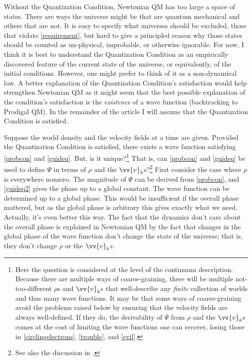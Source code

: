 \documentclass[onecolumn,secnumarabic,balancelastpage,amsmath,amssymb,nofootinbib]{article}
\begin{document}
Without the Quantization Condition, Newtonian QM has too large a space of states.  There are ways the universe might be that are quantum mechanical and others that are not.  It is easy to specify what universes should be excluded, those that violate \eqref{requirement}, but hard to give a principled reason why those states should be counted as un-physical, improbable, or otherwise ignorable.  For now, I think it is best to understand the Quantization Condition as an empirically discovered feature of the current state of the universe, or equivalently, of the initial conditions.  However, one might prefer to think of it as a non-dynamical law.  A better explanation of the Quantization Condition's satisfaction would help strengthen Newtonian QM as it might seem that the best possible explanation of the condition's satisfaction is the \emph{existence} of a wave function (backtracking to Prodigal QM).  In the remainder of the article I will assume that the Quantization Condition is satisfied.

Suppose the world density and the velocity fields at a time are given.  Provided the Quantization Condition is satisfied, there exists a wave function satisfying \eqref{probcon} and \eqref{guideq}.  But, is it unique?\footnote{Here the question is considered at the level of the continuum description.  Because there are multiple ways of coarse-graining, there will be multiple not-too-different $\rho$s and $\vv{v}_k$s that well-describe any \emph{finite} collection of worlds and thus many wave functions.  It may be that some ways of coarse-graining avoid the problems raised below by ensuring that the velocity fields are always well-defined.  If they do, the derivability of $\Psi$ from $\rho$ and the $\vv{v}_k$s comes at the cost of limiting the wave functions one can recover, losing those in \eqref{circlingelectrons}, \eqref{trouble}, and \eqref{evil}.}  That is, can \eqref{probcon} and \eqref{guideq} be used to define $\Psi$ in terms of $\rho$ and the $\vv{v}_k$s?\footnote{See also the discussion in \citet[][]{holland2005}.}  First consider the case where $\rho$ is everywhere nonzero.  The magnitude of $\Psi$ can be derived from \eqref{probcon}, and \eqref{guideq2} gives the phase up to a global constant.  The wave function can be determined up to a global phase.  This would be insufficient if the overall phase mattered, but as the global phase is arbitrary this gives exactly what we need.  Actually, it's even better this way.  The fact that the dynamics don't care about the overall phase is explained in Newtonian QM by the fact that changes in the global phase of the wave function don't change the state of the universe; that is, they don't change $\rho$ or the $\vv{v}_k$s.
\end{document}
